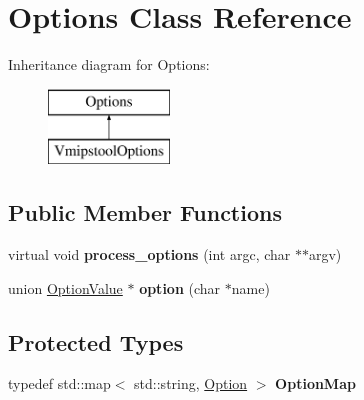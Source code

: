 \hypertarget{classOptions}{
\section{Options Class Reference}
\label{classOptions}
}
Inheritance diagram for Options:\begin{figure}[H]
\begin{center}
\leavevmode
\includegraphics[height=2cm]{classOptions}
\end{center}
\end{figure}
\subsection*{Public Member Functions}
\begin{DoxyCompactItemize}
\item 
\hypertarget{classOptions_a3bcfc6315059cdfc80086ac4e8ebb8fb}{
virtual void {\bfseries process\_\-options} (int argc, char $\ast$$\ast$argv)}
\label{classOptions_a3bcfc6315059cdfc80086ac4e8ebb8fb}

\item 
\hypertarget{classOptions_a3a535c4c76588d00f62c9817bc0ff63b}{
union \hyperlink{unionOptionValue}{OptionValue} $\ast$ {\bfseries option} (char $\ast$name)}
\label{classOptions_a3a535c4c76588d00f62c9817bc0ff63b}

\end{DoxyCompactItemize}
\subsection*{Protected Types}
\begin{DoxyCompactItemize}
\item 
\hypertarget{classOptions_af9c17aca9b06a52a376735f3985613a2}{
typedef std::map$<$ std::string, \hyperlink{structOption}{Option} $>$ {\bfseries OptionMap}}
\label{classOptions_af9c17aca9b06a52a376735f3985613a2}

\end{DoxyCompactItemize}
